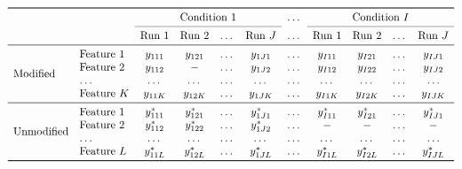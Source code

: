 \documentclass{mcp}
\begin{document}
\begin{figure}[h!]
\centering
\begin{footnotesize}
\[
\begin{array}{l l c c c c c c c c c} 
\toprule
 &  & \multicolumn{4}{c}{\text{Condition }1} & \dots & \multicolumn{4}{c}{\text{Condition }I} \\ 
\cmidrule{3-6} 
\cmidrule{8-11} 
 &  &  \text{Run }1 & \text{Run }2 & \dots & \text{Run }J & \dots & \text{Run }1 & \text{Run }2 & \dots & \text{Run }J \\
\midrule
\multirow{4}{*}{Modified} & \text{Feature }1 & y_{111} & y_{121} & \dots & y_{1J1} & \dots & y_{I11} & y_{I21} & \dots & y_{IJ1} \\
 & \text{Feature }2 & y_{112} & - & \dots & y_{1J2} & \dots & y_{I12} & y_{I22} & \dots & y_{IJ2}  \\
 & \dots & \dots & \dots & \dots & \dots & \dots & \dots & \dots & \dots & \dots \\
 & \text{Feature }K & y_{11K} & y_{12K} & \dots & y_{1JK} & \dots & y_{I1K} & y_{I2K} & \dots & y_{IJK} \\
\midrule
\multirow{4}{*}{Unmodified} & \text{Feature }1 & y_{111}^{\ast} & y_{121}^{\ast} & \dots & y_{1J1}^{\ast} & \dots & y_{I11}^{\ast} & y_{I21}^{\ast} & \dots & y_{IJ1}^{\ast} \\
 & \text{Feature }2 & y_{112}^{\ast} & y_{122}^{\ast} & \dots & y_{1J2}^{\ast} & \dots & - & - & \dots & -  \\
 & \dots & \dots & \dots & \dots & \dots & \dots & \dots & \dots & \dots & \dots \\
 & \text{Feature }L & y_{11L}^{\ast} & y_{12L}^{\ast} & \dots & y_{1JL}^{\ast} & \dots & y_{I1L}^{\ast} & y_{I2L}^{\ast} & \dots & y_{IJL}^{\ast} \\
\bottomrule
\end{array}
\]

\end{footnotesize}
\end{figure}
\end{document}
